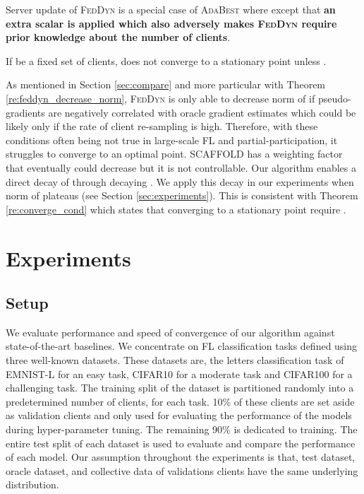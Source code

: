 \documentclass[runningheads]{llncs}
\newcommand{\scaffold}{\textsc{SCAFFOLD}\xspace}
\newcommand{\feddyn}{\textsc{FedDyn}\xspace}
\newcommand{\ours}{\textsc{AdaBest}\xspace}
\def\cifart{{\textsc{CIFAR10}}}
\def\cifarh{{\textsc{CIFAR100}}}
\def\emnist{{\textsc{EMNIST-L}}}
\begin{document}
\begin{remark}
\label{re:spectrum}
Server update of \feddyn is a special case of \ours where  except that \textbf{an extra  scalar is applied which also adversely makes \feddyn require prior knowledge about the number of clients}.
\end{remark}

\begin{theorem}
\label{re:converge_cond}
If  be a fixed set of clients,  does not converge to a stationary point unless .
\end{theorem}
As mentioned in Section \ref{sec:compare} and more particular with Theorem \ref{re:feddyn_decrease_norm}, \feddyn is only able to decrease norm of  if pseudo-gradients are negatively correlated with oracle gradient estimates which could be likely only if the rate of client re-sampling is high. Therefore, with these conditions often being not true in large-scale FL and partial-participation, it struggles to converge to an optimal point. \scaffold has a weighting factor that eventually could decrease  but it is not controllable. Our algorithm enables a direct decay of  through decaying . We apply this decay in our experiments when norm of  plateaus (see Section \ref{sec:experiments}). This is consistent with Theorem \ref{re:converge_cond} which states that converging to a stationary point require . 


\section{Experiments}

\subsection{Setup}
We evaluate performance and speed of convergence of our algorithm against state-of-the-art baselines. We concentrate on FL classification tasks defined using three well-known datasets. These datasets are, the letters classification task of \emnist{} \cite{lecun1998gradient} for an easy task, \cifart{} \cite{krizhevsky2009learning} for a moderate task and \cifarh{} \cite{krizhevsky2009learning} for a challenging task. The training split of the dataset is partitioned randomly into a predetermined number of clients, for each task. 10\% of these clients are set aside as validation clients and only used for evaluating the performance of the models during hyper-parameter tuning. The remaining 90\% is dedicated to training. The entire test split of each dataset is used to evaluate and compare the performance of each model. Our assumption throughout the experiments is that, test dataset, oracle dataset, and collective data of validations clients have the same underlying distribution. 
\end{document}

